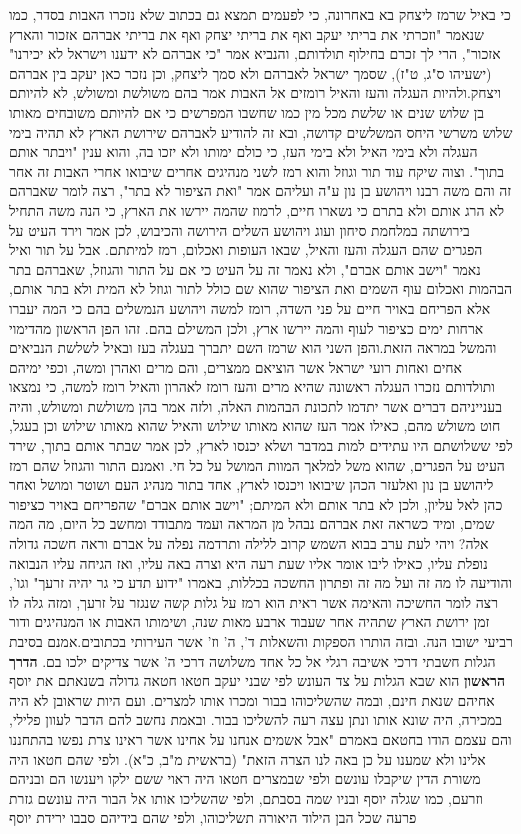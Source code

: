 \documentclass[12pt, openany]{book}
\begin{document}
כי באיל שרמז ליצחק בא באחרונה, כי לפעמים תמצא גם בכתוב שלא נזכרו האבות בסדר, כמו שנאמר "וזכרתי את בריתי יעקב  ואף את בריתי יצחק ואף את בריתי אברהם אזכור והארץ אזכור", הרי לך זכרם בחילוף תולדותם, והנביא אמר "כי אברהם לא ידענו וישראל לא יכירנו" (ישעיהו ס"ג, ט"ז), שסמך ישראל לאברהם ולא סמך ליצחק, וכן נזכר כאן יעקב בין אברהם ויצחק.ולהיות העגלה והעז והאיל רומזים אל האבות אמר בהם משולשת ומשולש, לא להיותם בן שלוש שנים או שלשת מכל מין כמו שחשבו המפרשים כי אם להיותם משובחים מאותו שלוש משרשי היחס המשלשים קדושה, ובא זה להודיע לאברהם שירושת הארץ לא תהיה בימי העגלה ולא בימי האיל ולא בימי העז, כי כולם ימותו ולא יזכו בה, והוא ענין "ויבתר אותם בתוך". וצוה שיקח עוד תור וגוזל והוא רמז לשני מנהיגים אחרים שיבואו אחרי האבות זה אחר זה והם משה רבנו ויהושע בן נון ע"ה ועליהם אמר "ואת הציפור לא בתר", רצה לומר שאברהם לא הרג אותם ולא בתרם כי נשארו חיים, לרמוז שהמה יירשו את הארץ, כי הנה משה התחיל בירושתה במלחמת סיחון ועוג ויהושע השלים הירושה והכיבוש, לכן אמר וירד העיט על הפגרים שהם העגלה והעז והאיל, שבאו העופות ואכלום, רמז למיתתם. אבל על תור ואיל נאמר "וישב אותם אברם", ולא נאמר זה על העיט כי אם על התור והגוזל, שאברהם בתר הבהמות ואכלום עוף השמים ואת הציפור שהוא שם כולל לתור וגוזל לא המית ולא בתר אותם, אלא הפריחם באויר חיים על פני השדה, רומז למשה ויהושע הנמשלים בהם כי המה יעברו ארחות ימים כציפור לעוף והמה יירשו ארץ, ולכן המשילם בהם. זהו הפן הראשון מהדימוי והמשל במראה הזאת.והפן השני הוא שרמז השם יתברך בעגלה בעז ובאיל  לשלשת הנביאים אחים ואחות רועי ישראל אשר הוציאם ממצרים, והם מרים ואהרן ומשה, וכפי ימיהם ותולדותם נזכרו העגלה ראשונה שהיא מרים והעז רומז לאהרון והאיל רומז למשה, כי נמצאו בענייניהם דברים אשר יתדמו לתכונת הבהמות האלה, ולזה אמר בהן משולשת ומשולש, והיה חוט משולש מהם, כאילו אמר העז שהוא מאותו שילוש והאיל שהוא מאותו שילוש וכן בעגל, לפי ששלושתם היו עתידים למות במדבר ושלא יכנסו לארץ, לכן אמר שבתר אותם בתוך, שירד העיט על הפגרים, שהוא משל למלאך המוות המושל על כל חי. ואמנם התור והגוזל שהם רמז ליהושע בן נון ואלעזר הכהן שיבואו ויכנסו לארץ, אחד בתור מנהיג העם ושוטר ומושל ואחר כהן לאל עליון, ולכן לא בתר אותם ולא המיתם; "וישב אותם אברם" שהפריחם באויר כציפור שמים, ומיד כשראה זאת אברהם נבהל מן המראה ועמד מתבודד ומחשב כל היום, מה המה אלה? ויהי לעת ערב בבוא השמש קרוב ללילה ותרדמה נפלה על אברם וראה חשכה גדולה נופלת עליו, כאילו ליבו אומר אליו שעת רעה היא וצרה באה עליו, ואז הגיחה עליו הנבואה והודיעה לו מה זה ועל מה זה ופתרון החשכה בכללות, באמרו "ידוע תדע כי גר יהיה זרעך" וגו', רצה לומר החשיכה והאימה אשר ראית הוא רמז על גלות קשה שנגזר על זרעך, ומזה גלה לו זמן ירושת הארץ שתהיה אחר שעבוד ארבע מאות שנה, ושימותו האבות או המנהיגים ודור רביעי ישובו הנה. ובזה הותרו הספקות והשאלות ד', ה' וז' אשר העירותי בכתובים.אמנם בסיבת הגלות חשבתי דרכי אשיבה רגלי אל כל אחד משלושה דרכי ה' אשר צדיקים ילכו בם. \textrm{\textbf{הדרך הראשון}} הוא שבא הגלות על צד העונש לפי שבני יעקב חטאו חטאה גדולה בשנאתם את יוסף אחיהם שנאת חינם, ובמה שהשליכוהו בבור ומכרו אותו למצרים. ועם היות שראובן לא היה במכירה, היה שונא אותו ונתן עצה רעה להשליכו בבור. ובאמת נחשב להם הדבר לעוון פלילי, והם עצמם הודו בחטאם באמרם "אבל אשמים אנחנו על אחינו אשר ראינו צרת נפשו בהתחננו אלינו ולא שמענו על כן באה לנו הצרה הזאת" (בראשית מ"ב, כ"א). ולפי שהם חטאו היה משורת הדין שיקבלו עונשם ולפי שבמצרים חטאו היה ראוי ששם ילקו ויענשו הם ובניהם וזרעם, כמו שגלה יוסף ובניו שמה בסבתם, ולפי שהשליכו אותו אל הבור היה עונשם גזרת פרעה שכל הבן הילוד היאורה תשליכוהו, ולפי שהם בידיהם סבבו ירידת יוסף 
\end{document}
